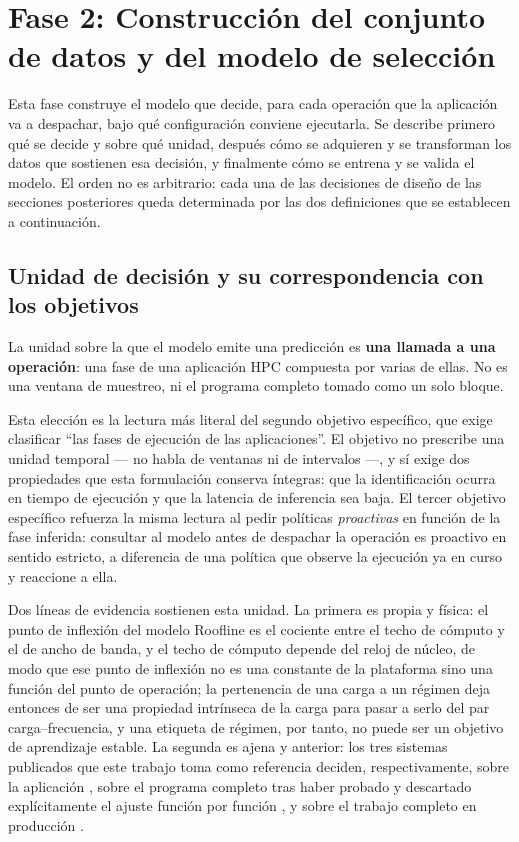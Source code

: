\documentclass[12pt,oneside,spanish]{book}
\begin{document}
\section{Fase 2: Construcción del conjunto de datos y del modelo de selección}
\label{sec:fase2}

Esta fase construye el modelo que decide, para cada operación que la aplicación va a despachar, bajo qué configuración conviene ejecutarla. Se describe primero qué se decide y sobre qué unidad, después cómo se adquieren y se transforman los datos que sostienen esa decisión, y finalmente cómo se entrena y se valida el modelo. El orden no es arbitrario: cada una de las decisiones de diseño de las secciones posteriores queda determinada por las dos definiciones que se establecen a continuación.

\subsection{Unidad de decisión y su correspondencia con los objetivos}
\label{sec:fase2-unidad}

La unidad sobre la que el modelo emite una predicción es \textbf{una llamada a una operación}: una fase de una aplicación HPC compuesta por varias de ellas. No es una ventana de muestreo, ni el programa completo tomado como un solo bloque.

Esta elección es la lectura más literal del segundo objetivo específico, que exige clasificar ``las fases de ejecución de las aplicaciones''. El objetivo no prescribe una unidad temporal --- no habla de ventanas ni de intervalos ---, y sí exige dos propiedades que esta formulación conserva íntegras: que la identificación ocurra en tiempo de ejecución y que la latencia de inferencia sea baja. El tercer objetivo específico refuerza la misma lectura al pedir políticas \textit{proactivas} en función de la fase inferida: consultar al modelo antes de despachar la operación es proactivo en sentido estricto, a diferencia de una política que observe la ejecución ya en curso y reaccione a ella.

Dos líneas de evidencia sostienen esta unidad. La primera es propia y física: el punto de inflexión del modelo Roofline es el cociente entre el techo de cómputo y el de ancho de banda, y el techo de cómputo depende del reloj de núcleo, de modo que ese punto de inflexión no es una constante de la plataforma sino una función del punto de operación; la pertenencia de una carga a un régimen deja entonces de ser una propiedad intrínseca de la carga para pasar a serlo del par carga--frecuencia, y una etiqueta de régimen, por tanto, no puede ser un objetivo de aprendizaje estable. La segunda es ajena y anterior: los tres sistemas publicados que este trabajo toma como referencia deciden, respectivamente, sobre la aplicación \cite{Guerreiro2019}, sobre el programa completo tras haber probado y descartado explícitamente el ajuste función por función \cite{Calore2017}, y sobre el trabajo completo en producción \cite{Antici2024}.
\end{document}
